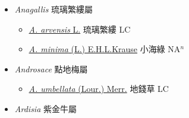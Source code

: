 
  \begin{itemize}
 \item[] \textit{Anagallis} 琉璃繁縷屬
                    
  \begin{itemize}
        \item[] \href{http://www.theplantlist.org/tpl1.1/search?q=Anagallis+arvensis}{\textit{A. arvensis} L.}   琉璃繁縷 LC
        \item[] \href{http://www.theplantlist.org/tpl1.1/search?q=Anagallis+minima}{\textit{A. minima} (L.) E.H.L.Krause}   小海綠 NA$^n$
  \end{itemize}
 \item[] \textit{Androsace} 點地梅屬
                    
  \begin{itemize}
        \item[] \href{http://www.theplantlist.org/tpl1.1/search?q=Androsace+umbellata}{\textit{A. umbellata} (Lour.) Merr.}   地錢草 LC
  \end{itemize}
 \item[] \textit{Ardisia} 紫金牛屬
                    

\end{itemize}
